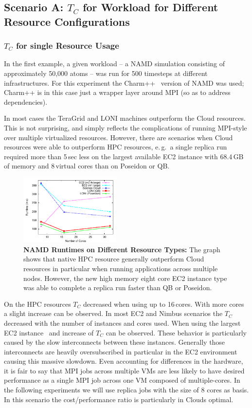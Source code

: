 \documentclass[conference,final]{IEEEtran}
\newcommand{\up}{\vspace*{-1em}}
\newcommand{\tc}{$T_{C}$ }
\begin{document}
\subsection{Scenario A: \tc for Workload for Different Resource
  Configurations}
\up

\subsubsection{\tc for single Resource Usage}

In the first example, a given workload -- a NAMD simulation consisting
of approximately 50,000 atoms -- was run for 500 timesteps at different
infrastructures. For this experiment the Charm++~\cite{871085} version
of NAMD was used; Charm++ is in this case just a wrapper layer around
MPI (so as to address dependencies).

In most cases the TeraGrid and LONI machines outperform the Cloud
resources. This is not surprising, and simply reflects the
complications of running MPI-style over multiple virtualized
resources. However, there are scenarios when Cloud resources were able
to outperform HPC resources, e.\,g.\ a single replica run required
more than 5\,sec less on the largest available EC2 instance with
68.4\,GB of memory and 8\,virtual cores than on Poseidon or QB.

\begin{figure}[htbp]
    \centering
    \includegraphics[width=0.45\textwidth]{performance/namd_run.pdf}
    \caption{\textbf{NAMD Runtimes on Different Resource Types: } The
      graph shows that native HPC resource generally outperform Cloud
      resources in particular when running applications across
      multiple nodes. However, the new high memory eight core EC2
      instance type was able to complete a replica run faster than QB
      or Poseidon.\up}
    \label{fig:performance_namd_run}
\end{figure}

On the HPC resources \tc decreased when using up to 16\,cores. With
more cores a slight increase can be observed. In most EC2 and Nimbus
scenarios the \tc decreased with the number of instances and cores
used. When using the largest EC2 instance~\cite{new-ec2} and increase
of \tc can be observed. These behavior is particularly caused by the
slow interconnects between these instances. Generally those
interconnects are heavily oversubscribed in particular in the EC2
environment causing this massive slowdown.  Even accounting for
differences in the hardware, it is fair to say that MPI jobs across
multiple VMs are less likely to have desired performance as a single
MPI job across one VM composed of multiple-cores. In the following
experiments we will use replica jobs with the size of 8 cores as
basis. In this scenario the cost/performance ratio is particularly in
Clouds optimal.
\end{document}
